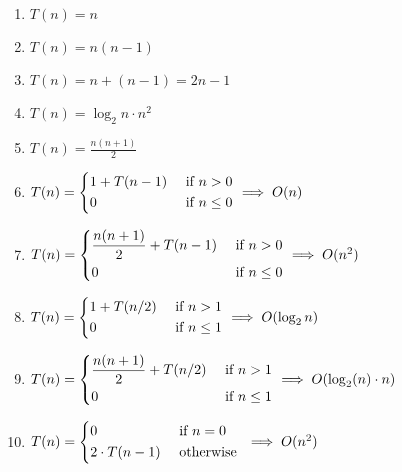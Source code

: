 \documentclass[a4paper]{report}
\begin{document}
\begin{enumerate}
    \item $T(n) = n$
    \item $T(n) = n(n-1)$
    \item $T(n) = n + (n-1) = 2n-1$
    \item $T(n) = \log_{2}n \cdot n^{2}$
    \item $T(n) = \frac{n(n+1)}{2}$
    \item $T(n) = \begin{dcases}
                  1 + T(n-1) & \text{ if } n > 0   \\
                  0          & \text{ if } n \le 0 \\
              \end{dcases}  \implies O(n)$
    \item $T(n) = \begin{dcases}
                  \frac{n(n+1)}{2} + T(n-1) & \text{ if } n > 0   \\
                  0                         & \text{ if } n \le 0 \\
              \end{dcases}  \implies O(n^{2})$
    \item $T(n) = \begin{dcases}
                  1 + T(n/2) & \text{ if } n > 1   \\
                  0          & \text{ if } n \le 1 \\
              \end{dcases}  \implies O(\log_{2}n)$
    \item $T(n) = \begin{dcases}
                  \frac{n(n+1)}{2} + T(n/2) & \text{ if } n > 1   \\
                  0                         & \text{ if } n \le 1 \\
              \end{dcases}  \implies O(\log_{2}(n) \cdot n)$
    \item $T(n) = \begin{dcases}
                  0              & \text{ if } n = 0  \\
                  2 \cdot T(n-1) & \text{ otherwise } \\
              \end{dcases}  \implies O(n^{2})$
\end{enumerate}
\end{document}
